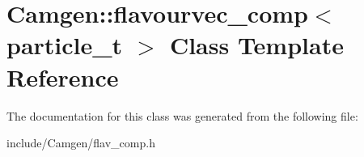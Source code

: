 \hypertarget{a00230}{\section{Camgen\-:\-:flavourvec\-\_\-comp$<$ particle\-\_\-t $>$ Class Template Reference}
\label{a00230}
}


The documentation for this class was generated from the following file\-:\begin{DoxyCompactItemize}
\item 
include/\-Camgen/flav\-\_\-comp.\-h\end{DoxyCompactItemize}
